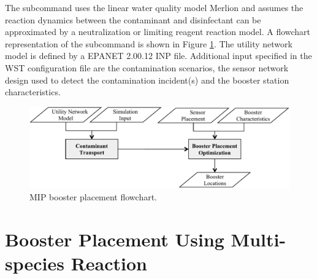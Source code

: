 The  
subcommand uses the linear water quality model Merlion and assumes the reaction dynamics between the contaminant and 
disinfectant can be approximated by a neutralization or limiting reagent reaction model.
A flowchart representation of the  subcommand is shown in Figure \ref{fig:booster_mip_flowchart}. 
The utility network model is defined by a EPANET 2.00.12 INP file. Additional input specified in the  WST 
configuration file are the contamination scenarios, the sensor network design used to detect 
the contamination incident(s) and the booster station characteristics. 

\begin{figure}[h]
  \centering
  \includegraphics[scale=0.75]{graphics/booster_mip_flowchart.pdf}
  \caption{MIP booster placement flowchart.}
  \label{fig:booster_mip_flowchart}
\end{figure}

\section{Booster Placement Using Multi-species Reaction}\label{booster_msx_formulations}

